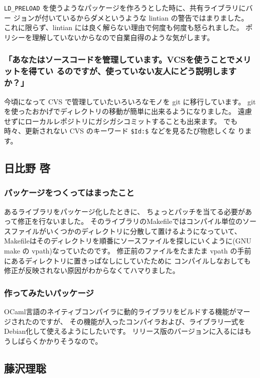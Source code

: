 \documentclass[mingoth,a4paper]{jsarticle}
\begin{document}
\verb!LD_PRELOAD! を使うようなパッケージを作ろうとした時に、共有ライブラリにバー
ジョンが付いているからダメというような lintian の警告ではまりました。
これに限らず、lintian には良く解らない理由で何度も何度も怒られました。
ポリシーを理解していないからなので自業自得のような気がします。

\subsubsection{「あなたはソースコードを管理しています。VCSを使うことでメリットを得てい
るのですが、使っていない友人にどう説明しますか？」}
今頃になって CVS で管理していたいろいろなモノを git に移行しています。
git を使ったおかげでディレクトリの移動が簡単に出来るようになりました。
遠慮せずにローカルレポジトリにガシガシコミットすることも出来ます。
でも時々、更新されない CVS のキーワード \verb!$Id:$! などを見るたび物悲しくな
ります。

\subsection{日比野 啓}

\subsubsection{パッケージをつくってはまったこと}

あるライブラリをパッケージ化したときに、
ちょっとパッチを当てる必要があって修正を行ないました。
そのライブラリのMakefileではコンパイル単位のソースファイルがいくつかのディレクトリに分散して置けるようになっていて、
Makefileはそのディレクトリを順番にソースファイルを探しにいくように(GNU make の vpath)なっていたのです。
修正前のファイルをたまたま vpath の手前にあるディレクトリに置きっぱなしにしていたために
コンパイルしなおしても修正が反映されない原因がわからなくてハマりました。

\subsubsection{作ってみたいパッケージ}

OCaml言語のネイティブコンパイラに動的ライブラリをビルドする機能がマージされたのですが、
その機能が入ったコンパイラおよび、ライブラリ一式をDebian化して使えるようにしたいです。
リリース版のバージョンに入るにはもうしばらくかかりそうなので。

\subsection{藤沢理聡}
\end{document}

